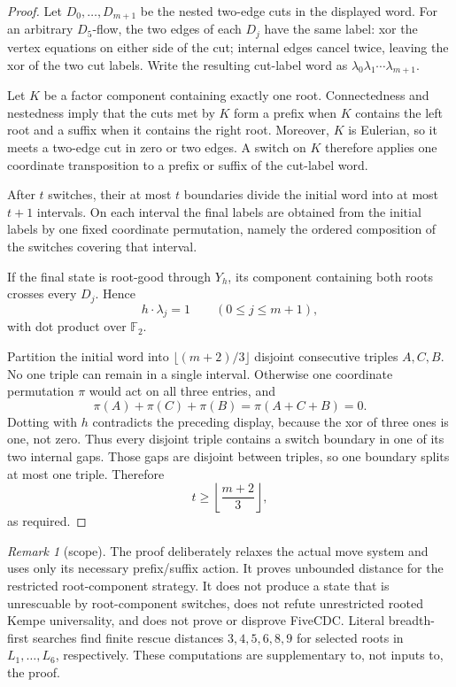 \documentclass[11pt]{article}
\theoremstyle{definition}
\theoremstyle{remark}
\newtheorem{remark}[theorem]{Remark}
\newcommand{\F}{\mathbb F}
\begin{document}
\begin{proof}
Let \(D_0,\ldots,D_{m+1}\) be the nested two-edge cuts in the displayed
word.  For an arbitrary \(D_5\)-flow, the two edges of each \(D_j\) have
the same label: xor the vertex equations on either side of the cut;
internal edges cancel twice, leaving the xor of the two cut labels.
Write the resulting cut-label word as
\(\lambda_0\lambda_1\cdots\lambda_{m+1}\).

Let \(K\) be a factor component containing exactly one root.  Connectedness
and nestedness imply that the cuts met by \(K\) form a prefix when \(K\)
contains the left root and a suffix when it contains the right root.
Moreover, \(K\) is Eulerian, so it meets a two-edge cut in zero or two
edges.  A switch on \(K\) therefore applies one coordinate transposition
to a prefix or suffix of the cut-label word.

After \(t\) switches, their at most \(t\) boundaries divide the initial
word into at most \(t+1\) intervals.  On each interval the final labels
are obtained from the initial labels by one fixed coordinate permutation,
namely the ordered composition of the switches covering that interval.

If the final state is root-good through \(Y_h\), its component containing
both roots crosses every \(D_j\).  Hence
\[
                              h\cdot\lambda_j=1
                 \qquad(0\leq j\leq m+1),
\]
with dot product over \(\F_2\).

Partition the initial word into
\(\lfloor(m+2)/3\rfloor\) disjoint consecutive triples \(A,C,B\).
No one triple can remain in a single interval.  Otherwise one coordinate
permutation \(\pi\) would act on all three entries, and
\[
                \pi(A)+\pi(C)+\pi(B)=\pi(A+C+B)=0.
\]
Dotting with \(h\) contradicts the preceding display, because the xor of
three ones is one, not zero.  Thus every disjoint triple contains a
switch boundary in one of its two internal gaps.  Those gaps are disjoint
between triples, so one boundary splits at most one triple.  Therefore
\[
                         t\geq\left\lfloor\frac{m+2}{3}\right\rfloor,
\]
as required.
\end{proof}

\begin{remark}[scope]
The proof deliberately relaxes the actual move system and uses only its
necessary prefix/suffix action.  It proves unbounded distance for the
restricted root-component strategy.  It does not produce a state that is
unrescuable by root-component switches, does not refute unrestricted
rooted Kempe universality, and does not prove or disprove FiveCDC.
Literal breadth-first searches find finite rescue distances
\(3,4,5,6,8,9\) for selected roots in \(L_1,\ldots,L_6\), respectively.
These computations are supplementary to, not inputs to, the proof.
\end{remark}
\end{document}
